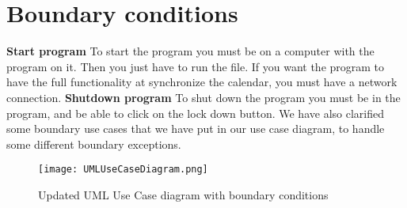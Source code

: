 \section{Boundary conditions}
\textbf{Start program}
To start the program you must be on a computer with the program on it. Then you just have to run the file. If you want the program to have the full functionality at synchronize the calendar, you must have a network connection. 
\newline
\newline
\textbf{Shutdown program}
To shut down the program you must be in the program, and be able to click on the lock down button. 
We have also clarified some boundary use cases that we have put in our use case diagram, to handle some different boundary exceptions. 


\begin{figure}[h]
\centering
\texttt{[image: UMLUseCaseDiagram.png]}
\caption{Updated UML Use Case diagram with  boundary conditions \label{overflow}}
\label{figur:usecase}
\end{figure}